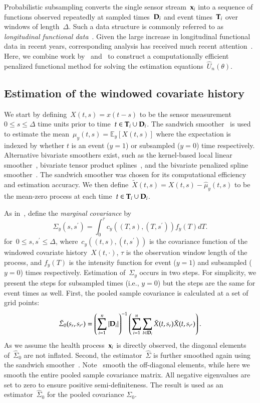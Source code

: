 \documentclass[12pt]{amsart}
\def\E{\mathcal{E}}
\def\E{\mathbb{E}}
\def\bfx{{\bf x}}
\def\bfT{{\bf T}}
\def\bfD{{\bf D}}
\begin{document}
Probabilistic subsampling converts the single sensor stream~$\bfx_i$ into a sequence of functions observed repeatedly at sampled times~$\bfD_i$ and event times~$\bfT_i$ over windows of length~$\Delta$. Such a data structure is commonly referred to as \emph{longitudinal functional data}~\citep{Xiao2013,Goldsmith2015}. Given the large increase in longitudinal functional data in recent years, corresponding analysis has received much recent attention~\citep{Morris2003, MorrisCarroll2006, Baladandayuthapani2008, Di2009, Greven2010, Staicu2010, ChenMuller2012, LiGuan2014}. Here, we combine work by~\cite{Park2018} and~\cite{Goldsmith2011} to construct a computationally efficient penalized functional method for solving the estimation equations~$\hat U_n (\theta)$.

\subsection{Estimation of the windowed covariate history}
\label{sec:margcov}
We start by defining~$X(t,s) = x(t-s)$ to be the sensor measurement~$0 \leq s \leq \Delta$ time units prior to time~$t \in \bfT_i \cup \bfD_i$. The sandwich smoother~\citep{Xiao2013} is used to estimate the mean~$\mu_y(t,s) = \E_y [ X(t,s)]$ where the expectation is indexed by whether $t$ is an event ($y=1$) or subsampled ($y=0$) time respectively. Alternative bivariate smoothers exist, such as the kernel-based local linear smoother~\citep{Hastie2009}, bivariate tensor product splines~\citep{Wood2006}, and the bivariate penalized spline smoother~\citep{MarxEilers2005}. The sandwich smoother was chosen for its computational efficiency and estimation accuracy. We then define~$\tilde X(t,s) = X(t,s) - \hat \mu_y(t,s)$ to be the mean-zero process at each time~$t \in \bfT_i \cup \bfD_i$.

As in~\cite{Park2018}, define the \emph{marginal covariance} by
\[
\Sigma_y (s, s^\prime) = \int_{0}^\tau c_y( (T,s), (T,s^\prime) ) f_y(T) dT.
\]
for~$0 \leq s,s^\prime \leq \Delta$, where~$c_y((t,s), (t,s^\prime))$ is the covariance function of the windowed covariate history~$X(t,\cdot)$, $\tau$ is the observation window length of the process, and $f_y(T)$ is the intensity function for event ($y=1$) and subsampled ($y=0$) times respectively. Estimation of~$\Sigma_y$ occurs in two steps. For simplicity, we present the steps for subsampled times (i.e., $y=0$) but the steps are the same for event times as well. First, the pooled sample covariance is calculated at a set of grid points:
\[
\tilde \Sigma_0 (s_r , s_{r^\prime}) = \left( \sum_{i=1}^n \left | \bfD_i \right |\right)^{-1} \left( \sum_{i=1}^n \sum_{t \in \bfD_i} \tilde X (t,s_r) \tilde X (t,s_{r^\prime}) \right).
\]
As we assume the health process~$\bfx_i$ is directly observed, the diagonal elements of~$\hat \Sigma_0$ are not inflated. Second, the estimator~$\hat \Sigma$ is further smoothed again using the sandwich smoother~\citep{Xiao2013}. Note~\cite{Park2018} smooth the off-diagonal elements, while here we smooth the entire pooled sample covariance matrix. All negative eigenvalues are set to zero to ensure positive semi-definiteness. The result is used as an estimator~$\hat \Sigma_0$ for the pooled covariance $\Sigma_0$.
\end{document}
